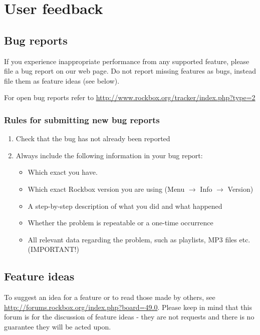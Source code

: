 \appendix










\chapter{User feedback}\label{sec:feedback}
\section{Bug reports}
If you experience inappropriate performance from any supported feature,
please file a bug report on our web page. Do not report missing
features as bugs, instead file them as feature ideas (see below).

For open bug reports refer to
\url{http://www.rockbox.org/tracker/index.php?type=2}

\subsection{Rules for submitting new bug reports}

\begin{enumerate}
\item  Check that the bug has not already been reported
\item  Always include the following information in your bug report:

\begin{itemize}
\item  Which exact \dap{} you have.
\item  Which exact Rockbox version you are using
(Menu $\rightarrow$ Info $\rightarrow$ Version)
\item  A step{}-by{}-step description of what you did and what happened
\item  Whether the problem is repeatable or a one{}-time occurrence
\item  All relevant data regarding the problem, such as playlists, MP3
files etc. (IMPORTANT!) 
\end{itemize}
\end{enumerate}

\section{Feature ideas}
To suggest an idea for a feature or to read those made by others, see
\url{http://forums.rockbox.org/index.php?board=49.0}.  Please keep in
mind that this forum is for the discussion of feature ideas - they are not
 requests and there is no guarantee they will be acted upon.

